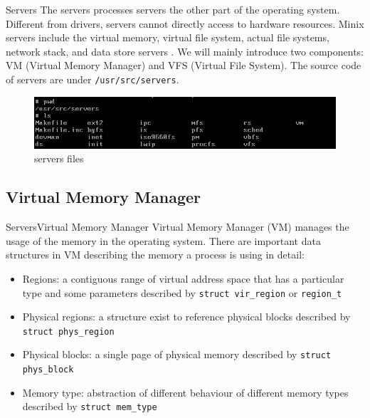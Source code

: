 \documentclass[12pt]{beamer}
\begin{document}
\begin{frame}{Servers}
The servers processes servers the other part of the operating system. Different from drivers, servers cannot directly access to hardware resources. Minix servers include the virtual memory, virtual file system, actual file systems, network stack, and data store servers \cite{minixarch}. We will mainly introduce two components: VM (Virtual Memory Manager) and VFS (Virtual File System). The source code of servers are under \texttt{/usr/src/servers}.
\begin{figure}[H]
    \centering
    \includegraphics[width=0.9\linewidth]{servers.png}
    \caption{servers files}
    \label{fig:servers_png}
\end{figure}
\end{frame}

\subsection{Virtual Memory Manager}
\begin{frame}{Servers}{Virtual Memory Manager}
    Virtual Memory Manager (VM) manages the usage of the memory in the operating system. There are important data structures in VM describing the memory a process is using in detail\cite{minixVM}:
    \begin{itemize}
        \item Regions: a contiguous range of virtual address space that has a particular type and some parameters described by \texttt{struct vir\_region} or \texttt{region\_t}
        \item Physical regions: a structure exist to reference physical blocks described by \texttt{struct phys\_region}
        \item Physical blocks: a single page of physical memory described by \texttt{struct phys\_block}
        \item Memory type: abstraction of different behaviour of different memory types described by \texttt{struct mem\_type}
    \end{itemize}
\end{frame}
\end{document}
